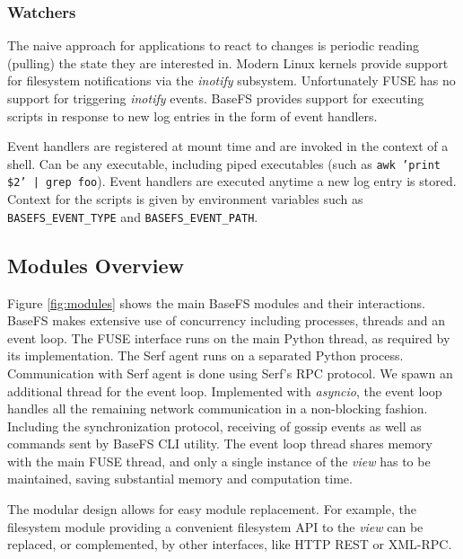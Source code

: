 \documentclass{sig-alternate}
\begin{document}
\subsubsection{Watchers}\label{watchers}
The naive approach for applications to react to changes is periodic reading (pulling) the state they are interested in. Modern Linux kernels provide support for filesystem notifications via the \textit{inotify} subsystem. Unfortunately FUSE has no support for triggering \textit{inotify} events. BaseFS provides support for executing scripts in response to new log entries in the form of event handlers.

Event handlers are registered at mount time and are invoked in the context of a shell. Can be any executable, including piped executables (such as \texttt{awk '{print \$2}' | grep foo}). Event handlers are executed anytime a new log entry is stored. Context for the scripts is given by environment variables such as \texttt{BASEFS\_EVENT\_TYPE} and \texttt{BASEFS\_EVENT\_PATH}.

\subsection{Modules Overview}\label{modules}

Figure \ref{fig:modules} shows the main BaseFS modules and their interactions. BaseFS makes extensive use of concurrency including processes, threads and an event loop. The FUSE interface runs on the main Python thread, as required by its implementation. The Serf agent runs on a separated Python process. Communication with Serf agent is done using Serf's RPC protocol. We spawn an additional thread for the event loop. Implemented with \textit{asyncio}, the event loop handles all the remaining network communication in a non-blocking fashion. Including the synchronization protocol, receiving of gossip events as well as commands sent by BaseFS CLI utility. The event loop thread shares memory with the main FUSE thread, and only a single instance of the \textit{view} has to be maintained, saving substantial memory and computation time.

The modular design allows for easy module replacement. For example, the filesystem module providing a convenient filesystem API to the \textit{view} can be replaced, or complemented, by other interfaces, like HTTP REST or XML-RPC.
\end{document}
